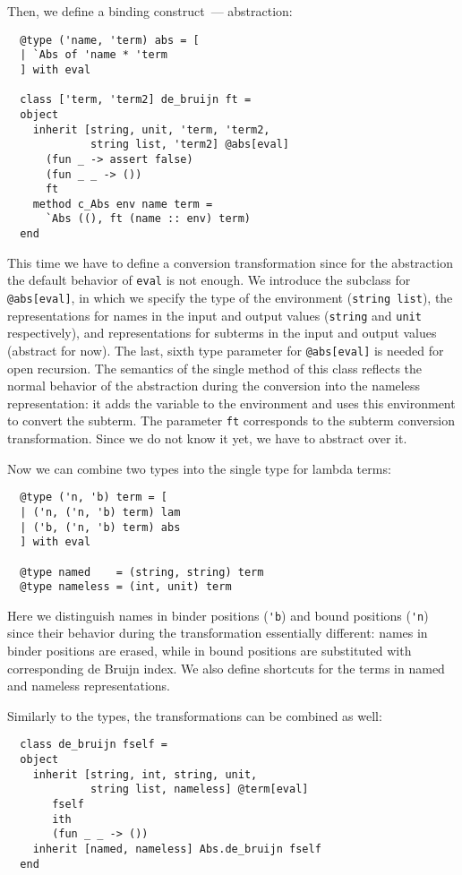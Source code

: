 \documentclass[submission,copyright,creativecommons]{eptcs}
\newcommand{\cd}[1]{\texttt{#1}}
\begin{document}
Then, we define a binding construct~--- abstraction:

\begin{lstlisting}
  @type ('name, 'term) abs = [
  | `Abs of 'name * 'term
  ] with eval
  
  class ['term, 'term2] de_bruijn ft =
  object
    inherit [string, unit, 'term, 'term2,
             string list, 'term2] @abs[eval]
      (fun _ -> assert false)
      (fun _ _ -> ())
      ft
    method c_Abs env name term =
      `Abs ((), ft (name :: env) term)
  end
\end{lstlisting}

This time we have to define a conversion transformation since for the abstraction the default behavior of \cd{eval} is not
enough. We introduce the subclass for \cd{@abs[eval]}, in which we specify the type of the environment (\lstinline{string list}),
the representations for names in the input and output values (\lstinline{string} and \lstinline{unit} respectively), and
representations for subterms in the input and output values (abstract for now). The last, sixth type parameter for \cd{@abs[eval]}
is needed for open recursion. The semantics of the single method of this class reflects the normal behavior of the
abstraction during the conversion into the nameless representation: it adds the variable to the environment and uses this
environment to convert the subterm. The parameter \lstinline{ft} corresponds to the subterm conversion transformation. Since
we do not know it yet, we have to abstract over it.

Now we can combine two types into the single type for lambda terms:

\begin{lstlisting}
  @type ('n, 'b) term = [
  | ('n, ('n, 'b) term) lam
  | ('b, ('n, 'b) term) abs
  ] with eval

  @type named    = (string, string) term
  @type nameless = (int, unit) term
\end{lstlisting}

Here we distinguish names in binder positions (\lstinline{'b}) and bound positions (\lstinline{'n}) since their behavior during the
transformation essentially different: names in binder positions are erased, while in bound positions are substituted with corresponding
de Bruijn index. We also define shortcuts for the terms in named and nameless representations.

Similarly to the types, the transformations can be combined as well:

\begin{lstlisting}
  class de_bruijn fself =
  object
    inherit [string, int, string, unit,
             string list, nameless] @term[eval]
       fself
       ith
       (fun _ _ -> ())
    inherit [named, nameless] Abs.de_bruijn fself
  end
\end{lstlisting}
\end{document}
